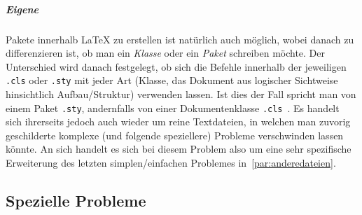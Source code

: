\subparagraph*{Eigene}Pakete innerhalb \LaTeX{} zu erstellen ist natürlich auch möglich, wobei danach zu differenzieren ist, ob man ein \textit{Klasse} oder ein \textit{Paket} schreiben möchte. Der Unterschied wird danach festgelegt, ob sich die Befehle innerhalb der jeweiligen \texttt{.cls} oder \texttt{.sty} mit jeder Art (Klasse, das Dokument aus logischer Sichtweise hinsichtlich Aufbau/Struktur) verwenden lassen. Ist dies der Fall spricht man von einem Paket \texttt{.sty}, andernfalls von einer Dokumentenklasse \texttt{.cls}~\citep{latex:documentation:clsguide}. Es handelt sich ihrerseits jedoch auch wieder um reine Textdateien, in welchen man zuvorig geschilderte komplexe (und folgende speziellere) Probleme verschwinden lassen könnte. An sich handelt es sich bei diesem Problem also um eine sehr spezifische Erweiterung des letzten simplen/einfachen Problemes in~\ref{par:anderedateien}.

\newpage
\subsection{Spezielle Probleme}

